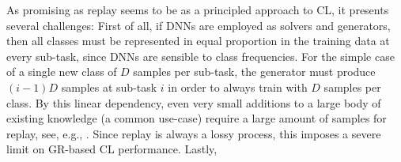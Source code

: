 \documentclass{article} %
\begin{document}
%
As promising as replay seems to be as a principled approach to CL, it presents several challenges: 
First of all, if DNNs are employed as solvers and generators, then all classes must be represented in equal proportion in the training data at every sub-task, since DNNs are sensible to class frequencies. 
For the simple case of a single new class of $D$ samples per sub-task, the generator must produce $(i-1)D$ samples at sub-task $i$ in order to always train with $D$ samples per class.
By this linear dependency, even very small additions to a large body of existing knowledge (a common use-case) require a large amount of samples for replay, see, e.g., \cite{nadz22}. Since replay is always a lossy process, this imposes a severe limit on GR-based CL performance.
%
Lastly, 
%
\end{document}
